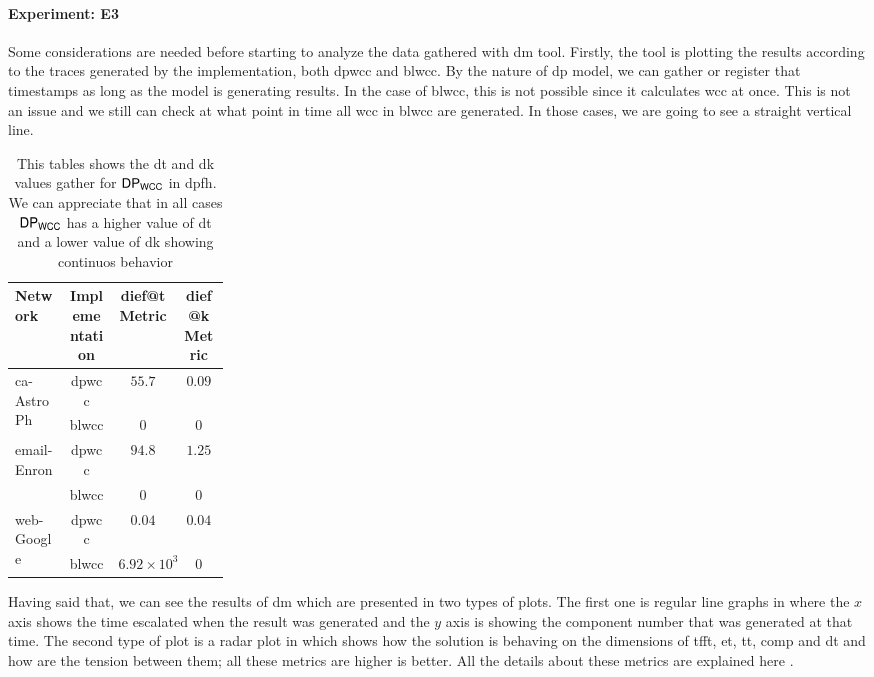 \paragraph{Experiment: E3}\label{sub:new:sec:e2}
Some considerations are needed before starting to analyze the data gathered with \acrshort{dm} tool. 
Firstly, the tool is plotting the results according to the traces generated by the implementation, both \acrshort{dpwcc} and \acrshort{blwcc}. 
By the nature of \acrshort{dp} model, we can gather or register that timestamps as long as the model is generating results. 
In the case of \acrshort{blwcc}, this is not possible since it calculates \acrshort{wcc} at once. 
This is not an issue and we still can check at what point in time all \acrshort{wcc} in \acrshort{blwcc} are generated. 
In those cases, we are going to see a straight vertical line. 

\begin{table}[htp!]
  \centering
  \begin{tabular}{|p{0.25\linewidth}|c|c|c|}
    \hline
   \textbf{Network} & \textbf{Implementation} & \textbf{dief@t Metric}  & \textbf{dief@k Metric}\\
   \hline
   \multirow{2}{*}{ca-AstroPh} & \acrshort{dpwcc} & $55.7$ & $0.09$\\
   & \acrshort{blwcc} & $0$ & $0$\\
   \hline
   \multirow{2}{*}{email-Enron} & \acrshort{dpwcc} & $94.8$ & $1.25$\\
   & \acrshort{blwcc} & $0$ & $0$\\
   \hline
   \multirow{2}{*}{web-Google} & \acrshort{dpwcc} & $0.04$ & $0.04$ \\
   & \acrshort{blwcc} & $6.92 \times 10^3$ & $0$\\
  \hline
  \end{tabular}
  \caption{This tables shows the \acrshort{dt} and \acrshort{dk} values gather for  $\mathsf{DP_{WCC}}$ in \acrshort{dpfh}. We can appreciate that in all cases $\mathsf{DP_{WCC}}$ has a higher value of \acrshort{dt} and a lower value of \acrshort{dk} showing continuos behavior}
 \label{table:e1:blh:dm:values}
 \end{table}

Having said that, we can see the results of \acrshort{dm} which are presented in two types of plots. 
The first one is regular line graphs in where the $x$ axis shows the time escalated when the result was generated and the $y$ axis is showing the component number that was generated at that time. The second type of plot is a radar plot in which shows how the solution is behaving on the dimensions of  \acrfull{tfft}, \acrfull{et}, \acrfull{tt}, \acrfull{comp} and \acrfull{dt} and how are the tension between them; all these metrics are higher is better. All the details about these metrics are explained here \cite{diefpaper}.

